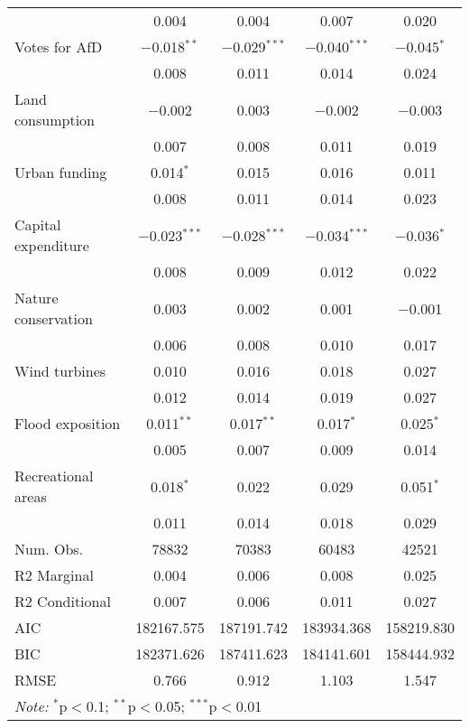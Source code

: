 \begin{table}
\begin{tabular}[t]{lcccc}
 & \num{0.004} & \num{0.004} & \num{0.007} & \num{0.020}\\
Votes for AfD & \num{-0.018}$^{**}$ & \num{-0.029}$^{***}$ & \num{-0.040}$^{***}$ & \num{-0.045}$^{*}$\\
 & \num{0.008} & \num{0.011} & \num{0.014} & \num{0.024}\\
Land consumption & \num{-0.002} & \num{0.003} & \num{-0.002} & \num{-0.003}\\
 & \num{0.007} & \num{0.008} & \num{0.011} & \num{0.019}\\
Urban funding & \num{0.014}$^{*}$ & \num{0.015} & \num{0.016} & \num{0.011}\\
 & \num{0.008} & \num{0.011} & \num{0.014} & \num{0.023}\\
Capital expenditure & \num{-0.023}$^{***}$ & \num{-0.028}$^{***}$ & \num{-0.034}$^{***}$ & \num{-0.036}$^{*}$\\
 & \num{0.008} & \num{0.009} & \num{0.012} & \num{0.022}\\
Nature conservation & \num{0.003} & \num{0.002} & \num{0.001} & \num{-0.001}\\
 & \num{0.006} & \num{0.008} & \num{0.010} & \num{0.017}\\
Wind turbines & \num{0.010} & \num{0.016} & \num{0.018} & \num{0.027}\\
 & \num{0.012} & \num{0.014} & \num{0.019} & \num{0.027}\\
Flood exposition & \num{0.011}$^{**}$ & \num{0.017}$^{**}$ & \num{0.017}$^{*}$ & \num{0.025}$^{*}$\\
 & \num{0.005} & \num{0.007} & \num{0.009} & \num{0.014}\\
Recreational areas & \num{0.018}$^{*}$ & \num{0.022} & \num{0.029} & \num{0.051}$^{*}$\\
 & \num{0.011} & \num{0.014} & \num{0.018} & \num{0.029}\\
\midrule
Num. Obs. & \num{78832} & \num{70383} & \num{60483} & \num{42521}\\
R2 Marginal & \num{0.004} & \num{0.006} & \num{0.008} & \num{0.025}\\
R2 Conditional & \num{0.007} & \num{0.006} & \num{0.011} & \num{0.027}\\
AIC & \num{182167.575} & \num{187191.742} & \num{183934.368} & \num{158219.830}\\
BIC & \num{182371.626} & \num{187411.623} & \num{184141.601} & \num{158444.932}\\
RMSE & \num{0.766} & \num{0.912} & \num{1.103} & \num{1.547}\\
\bottomrule
\multicolumn{5}{l}{\rule{0pt}{1em}\textit{Note: } $^{*}$p$<$0.1; $^{**}$p$<$0.05; $^{***}$p$<$0.01}\\
\end{tabular}
\end{table}